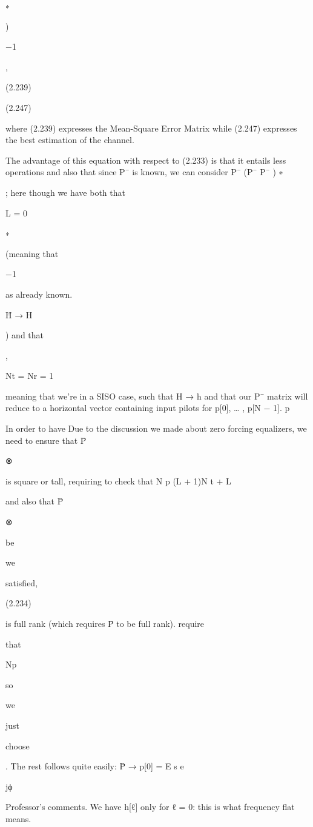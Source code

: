 {{{∗

)

−1

,

(2.239)

(2.247)

\sqrtG

where (2.239) expresses the Mean-Square Error Matrix while (2.247) expresses the best estimation of the channel.

The advantage of this equation with respect to (2.233) is that it entails less operations and also that since P¯ is known, we can consider P¯ (P¯ P¯ )
∗

; here though we have both that

L = 0

∗

(meaning that

−1

as already known.

H̄ → H

) and that

,

Nt = Nr = 1

meaning that we're in a SISO case, such that H → h and that our P¯ matrix will reduce to a horizontal vector containing input pilots for p[0], … , p[N − 1].
p

In order to have Due to the discussion we made about zero forcing equalizers, we need to ensure that P̄

⊗

is square or tall, requiring to check that N p \geq (L + 1)N t + L

and also that P̄

⊗

be

we

satisfied,

(2.234)

is full rank (which requires P̄ to be full rank).
require

that

Np 

so

we

just

choose

.
The rest follows quite easily:
P̄ → p[0] = \sqrt E s e

jϕ

Professor's comments.
We have h[ℓ]  only for ℓ = 0: this is what frequency flat means.

}}}
